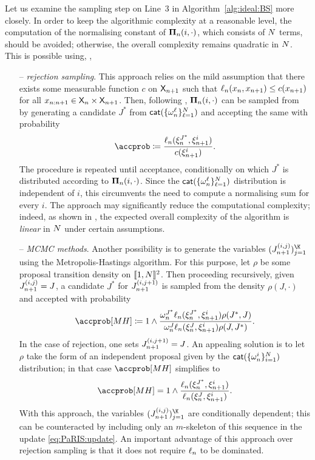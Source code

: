 Let us examine the sampling step on Line~3 in Algorithm~\ref{alg:ideal:BS} more closely. 
In order to keep the algorithmic complexity at a reasonable level, the computation of the normalising constant of $\boldsymbol{\Pi}_{n}(i, \cdot)$, which consists of $N$ terms, should be avoided; otherwise, the overall complexity remains quadratic in $N$. This is possible using, \eg,   
\begin{itemize}
\item[--] \emph{rejection sampling}. This approach relies on the mild assumption that there exists some measurable function $c$ on $\mathsf{X}_{n + 1}$ such that $\ell_{n}(x_n, x_{n + 1}) \leq c(x_{n + 1})$ for all $x_{n: n + 1} \in \mathsf{X}_n \times \mathsf{X}_{n + 1}$. Then, following \cite{douc:garivier:moulines:olsson:2010}, $\boldsymbol{\Pi}_{n}(i, \cdot)$ can be sampled from by generating a candidate $J^\ast$ from $\mathsf{cat}(\{ \omega_{n}^{\ell}\}_{\ell = 1}^N)$ and accepting the same with probability 
\begin{equation} \label{eq:std:acc:prob:backward:sampling}
\accprob \eqdef \frac{\ud{n}(\epart{n}{J^\ast}, \epart{n + 1}{i})}{c(\epart{n + 1}{i})}. 
\end{equation}
The procedure is repeated until acceptance, conditionally on which $J^\ast$ is distributed according to $\boldsymbol{\Pi}_{n}(i, \cdot)$. Since the $\mathsf{cat}(\{ \omega_{n}^{\ell}\}_{\ell = 1}^N)$ distribution is independent of $i$, this circumvents the need to compute a normalising sum for every $i$. The approach may significantly reduce the computational complexity; indeed, as shown in \cite[Proposition~2]{douc:garivier:moulines:olsson:2010}, the expected overall complexity of the algorithm is \emph{linear} in $N$ under certain assumptions.   
\item[--] \emph{MCMC methods}. Another possibility is to generate the variables $(\bi{n + 1}{i}{j})_{j = 1}^{\K}$ using the Metropolis-Hastings algorithm. For this purpose, let $\rho$ be some proposal transition density on $\llbracket 1, N \rrbracket^2$. Then proceeding recursively, given $J_{n + 1}^{(i, j)} = J$, a candidate $J^\ast$ for $J_{n + 1}^{(i, j + 1)}$ is sampled from the density $\rho(J, \cdot)$ and accepted with probability 
$$
\accprob[MH] \eqdef 1 \wedge\frac{\ewght{n}{J^\ast} \ud{n}(\epart{n}{J^\ast}, \epart{n + 1}{i}) \rho(J^\ast, J)}{\ewght{n}{J} \ud{n}(\epart{n}{J}, \epart{n + 1}{i}) \rho(J, J^\ast)}. 
$$ 
In the case of rejection, one sets $J_{n + 1}^{(i, j + 1)} = J$. An appealing solution is to let $\rho$ take the form of an independent proposal given by the $\mathsf{cat}(\{ \omega_{n}^{i} \}_{i = 1}^N)$ distribution; in that case $\accprob[MH]$ simplifies to  
\begin{equation} \label{eq:std:MH:prob:backward:sampling}
\accprob[MH] = 1 \wedge \frac{\ud{n}(\epart{n}{J^\ast}, \epart{n + 1}{i})}{\ud{n}(\epart{n}{J}, \epart{n + 1}{i})}. 
\end{equation}
With this approach, the variables $(\bi{n + 1}{i}{j})_{j = 1}^{\K}$ are conditionally dependent; this can be counteracted by including only an $m$-skeleton of this sequence in the update \eqref{eq:PaRIS:update}. An important advantage of this approach over rejection sampling is that it does not require $\ell_{n}$ to be dominated.  
\end{itemize}

